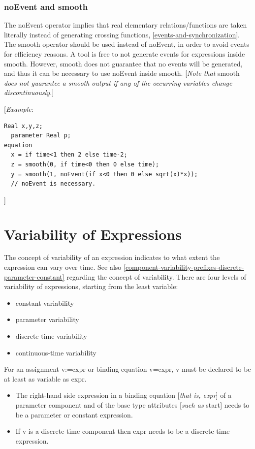 \documentclass[10pt,a4paper]{report}
\def\doublelabel#1{\label{#1}\hypertarget{#1}{}}
\begin{document}
\subsubsection{noEvent and smooth}\doublelabel{noevent-and-smooth}

The noEvent operator implies that real elementary relations/functions
are taken literally instead of generating crossing functions, \ref{events-and-synchronization}. 
The smooth operator should be used instead of noEvent, in order to
avoid events for efficiency reasons. A tool is free to not generate
events for expressions inside smooth. However, smooth does not guarantee
that no events will be generated, and thus it can be necessary to use
noEvent inside smooth. {[}\emph{Note that} smooth \emph{does not
guarantee a smooth output if any of the occurring variables change
discontinuously.}{]}

{[}\emph{Example}:
\begin{lstlisting}[language=modelica]
  Real x,y,z;
  parameter Real p;
equation
  x = if time<1 then 2 else time-2;
  z = smooth(0, if time<0 then 0 else time);
  y = smooth(1, noEvent(if x<0 then 0 else sqrt(x)*x));
  // noEvent is necessary.
\end{lstlisting}

{]}

\section{Variability of Expressions}\doublelabel{variability-of-expressions}

The concept of variability of an expression indicates to what extent the
expression can vary over time. See also \ref{component-variability-prefixes-discrete-parameter-constant} regarding the
concept of variability. There are four levels of variability of
expressions, starting from the least variable:

\begin{itemize}
\item
  constant variability
\item
  parameter variability
\item
  discrete-time variability
\item
  continuous-time variability
\end{itemize}

For an assignment v:=expr or binding equation v=expr, v must be declared
to be at least as variable as expr.

\begin{itemize}
\item
  The right-hand side expression in a binding equation {[}\emph{that is,
  expr}{]} of a parameter component and of the base type attributes
  {[}\emph{such as} start{]} needs to be a parameter or constant
  expression.
\item
  If v is a discrete-time component then expr needs to be a
  discrete-time expression.
\end{itemize}
\end{document}
